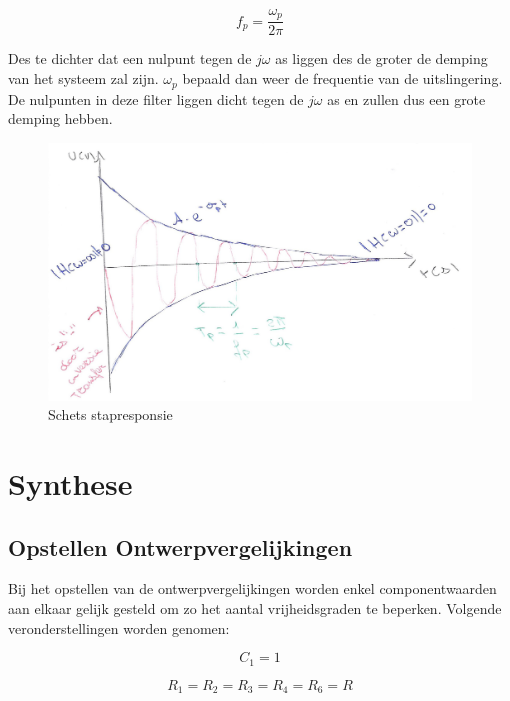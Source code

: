 \documentclass[]{article}
\begin{document}
\begin{equation*}
\boxed{ f_{p} =  \frac{\omega_{p}}{2\pi}}
\end{equation*}

Des te dichter dat een nulpunt tegen de $j\omega$ as liggen des de groter de demping van het systeem zal zijn. $\omega_{p}$ bepaald dan weer de frequentie van de uitslingering. De nulpunten in deze filter liggen dicht tegen de $j\omega$ as en zullen dus een grote demping hebben.


\begin{figure}[H]
	\centering
	\includegraphics[width=13cm]{schets_step}
	\caption{Schets stapresponsie}
\end{figure}

\newpage

\section{Synthese}

\subsection*{Opstellen Ontwerpvergelijkingen}

Bij het opstellen van de ontwerpvergelijkingen worden enkel componentwaarden aan elkaar gelijk gesteld om zo het aantal vrijheidsgraden te beperken. Volgende veronderstellingen worden genomen:

\begin{equation*}
C_{1} = 1
\end{equation*}

\begin{equation*}
R_{1} = R_{2} = R_{3} = R_{4} = R_{6} = R
\end{equation*}
\end{document}

